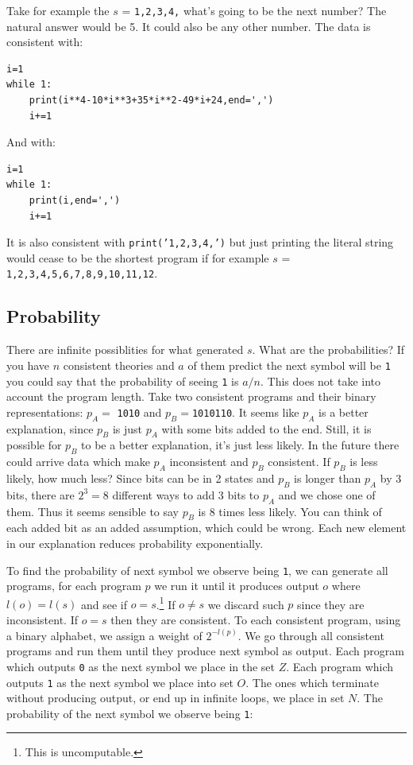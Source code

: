 Take for example the $s$ = \texttt{1,2,3,4,} what's going to be the next number? The natural answer would be 5. It could also be any other number. The data is consistent with:

\begin{lstlisting}[caption={This gives us 29 as the next number}]
i=1
while 1:
	print(i**4-10*i**3+35*i**2-49*i+24,end=',')
	i+=1
\end{lstlisting}

And with:

\begin{lstlisting}[caption={This gives us 5 as the next number}]
i=1
while 1:
	print(i,end=',')
	i+=1
\end{lstlisting} %

It is also consistent with \texttt{print('1,2,3,4,')} but just printing the literal string would cease to be the shortest program if for example $s$ = \texttt{1,2,3,4,5,6,7,8,9,10,11,12}.

\newpage

\subsection{Probability}

There are infinite possiblities for what generated $s$.
What are the probabilities?
If you have $n$ consistent theories and $a$ of them predict the next symbol will be \texttt{1} you could say that the probability of seeing \texttt{1} is $a/n$.
This does not take into account the program length.
Take two consistent programs and their binary representations: $p_A =$ \texttt{1010} and $p_B = $\texttt{1010110}.
It seems like $p_A$ is a better explanation, since $p_B$ is just $p_A$ with some bits added to the end.
Still, it is possible for $p_B$ to be a better explanation, it's just less likely.
In the future there could arrive data which make $p_A$ inconsistent and $p_B$ consistent.
If $p_B$ is less likely, how much less?
Since bits can be in 2 states and $p_B$ is longer than $p_A$ by 3 bits, there are $2^{3} = 8$ different ways to add 3 bits to $p_A$ and we chose one of them.
Thus it seems sensible to say $p_B$ is 8 times less likely.
You can think of each added bit as an added assumption, which could be wrong.
Each new element in our explanation reduces probability exponentially. 

To find the probability of next symbol we observe being \texttt{1}, we can generate all programs, for each program $p$ we run it until it produces output $o$ where $l(o) = l(s)$ and see if $o = s$.\footnote{This is uncomputable.}
If $o \neq s$ we discard such $p$ since they are inconsistent.
If $o = s$ then they are consistent.
To each consistent program, using a binary alphabet, we assign a weight of $2^{-l(p)}$.
We go through all consistent programs and run them until they produce next symbol as output.
Each program which outputs \texttt{0} as the next symbol we place in the set $Z$.
Each program which outputs \texttt{1} as the next symbol we place into set $O$.
The ones which terminate without producing output, or end up in infinite loops, we place in set $N$.
The probability of the next symbol we observe being \texttt{1}:

